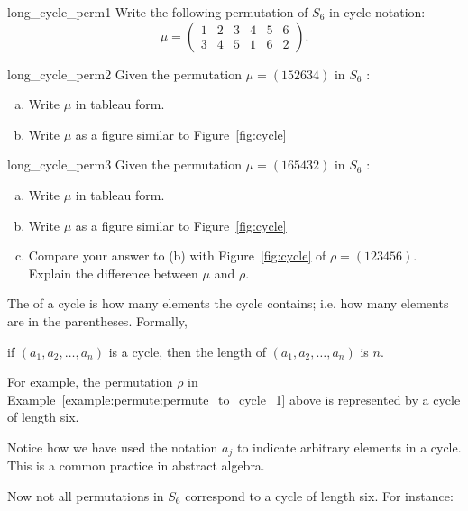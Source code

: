 \begin{exercise}{long_cycle_perm1}
Write the following permutation of $S_6$ in cycle notation:  
\[ \mu = \begin{pmatrix} 1 & 2 & 3 & 4 & 5 & 6 \\ 3 & 4 & 5 & 1 & 6 & 2 \end{pmatrix}. \]
\end{exercise}

\begin{exercise}{long_cycle_perm2}
Given the permutation $\mu = (152634)$ in $S_6$ :
\begin{enumerate}[(a)]
\item
Write $\mu$ in tableau form.
\item
Write $\mu$ as a figure similar to Figure~\ref{fig:cycle}
\end{enumerate}
\end{exercise}

\begin{exercise}{long_cycle_perm3}
Given the permutation $\mu = (165432)$ in $S_6$ :
\begin{enumerate}[(a)]
\item
Write $\mu$ in tableau form.
\item
Write $\mu$ as a figure similar to Figure~\ref{fig:cycle}
\item
Compare your answer to (b) with Figure~\ref{fig:cycle} of $\rho = (123456)$.  Explain the difference between $\mu$ and $\rho$. 
\end{enumerate}
\end{exercise}

\begin{defn} \label{cycle_length}
The  of a cycle is how many elements the cycle contains; i.e. how many elements are in the parentheses.  Formally, 
\begin{center}
if $(a_1, a_2, \ldots, a_n)$ is a cycle, then the length of $(a_1, a_2, \ldots, a_n)$ is $n$.
\end{center}
\end{defn}
For example, the permutation $\rho$ in Example~\ref{example:permute:permute_to_cycle_1} above is represented by a cycle of length six.

\begin{rem}
Notice how we have used the notation $a_j$ to indicate arbitrary elements in a cycle.  This is a common practice in abstract algebra.
\end{rem}

Now not all permutations in $S_6$ correspond to a cycle of length six.  For instance:

